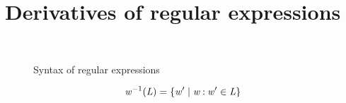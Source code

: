 \section{Derivatives of regular expressions}\label{sec:derivative}

\begin{figure}[h]
 \begin{small}
  \begin{center}
   \begin{grammar}
     \\
   \end{grammar}
  \end{center}
 \end{small}
 \caption{Syntax of regular expressions}
 \label{regExpSyn}
\end{figure}

\begin{definition}
 \[
  \mathit {w}^{-1}(\mathit {L}) = \{ \mathit {w}' \mid \mathit {w}\mathbin{:}\mathit {w}'\in\mathit {L} \}
 \]
\end{definition}

